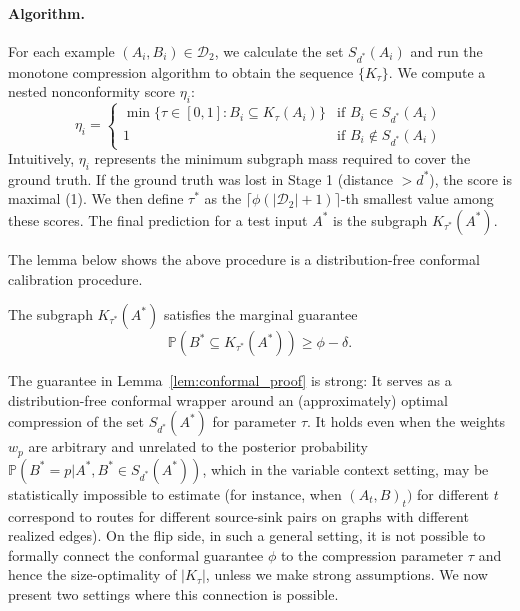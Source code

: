\paragraph{Algorithm.}
For each example $(A_i, B_i) \in \mathcal{D}_2$, we calculate the set $S_{d^*}(A_i)$ and run the monotone compression algorithm to obtain the sequence $\{K_\tau\}$. We compute a nested nonconformity score $\eta_i$:
\[
\eta_i = \begin{cases} 
\min \{ \tau \in [0,1] : B_i \subseteq K_\tau(A_i) \} & \text{if } B_i \in S_{d^*}(A_i) \\
1 & \text{if } B_i \notin S_{d^*}(A_i)
\end{cases}
\]
Intuitively, $\eta_i$ represents the minimum subgraph mass required to cover the ground truth. If the ground truth was lost in Stage 1 (distance $> d^*$), the score is maximal (1). We then define $\tau^*$ as the $\lceil \phi (|\mathcal{D}_2|+1) \rceil$-th smallest value among these scores. The final prediction for a test input $A^*$ is the subgraph $K_{\tau^*}(A^*)$. 

The lemma below shows the above procedure is a distribution-free conformal calibration procedure. %

\begin{lemma}
\label{lem:conformal_proof}
The subgraph $K_{\tau^*}(A^*)$ satisfies the marginal guarantee
\[ \mathbb{P}(B^* \subseteq K_{\tau^*}(A^*)) \ge \phi - \delta. \]
\end{lemma}

The guarantee in Lemma~\ref{lem:conformal_proof} is strong: It serves as a distribution-free conformal wrapper around an (approximately) optimal compression of the set $S_{d^*}(A^*)$ for parameter $\tau$. It holds even when the weights $w_p$ are arbitrary and unrelated to the posterior probability $\mathbb{P}(B^* = p | A^*, B^* \in S_{d^*}(A^*))$, which in the variable context setting, may be statistically impossible to estimate (for instance, when $(A_t,B)_t)$ for different $t$ correspond to routes for different source-sink pairs on graphs with different realized edges). On the flip side, in such a general setting, it is not possible to formally connect the conformal guarantee $\phi$ to the compression parameter $\tau$ and hence the size-optimality of $|K_{\tau}|$, unless we make strong assumptions. We now present two settings where this connection is possible.

